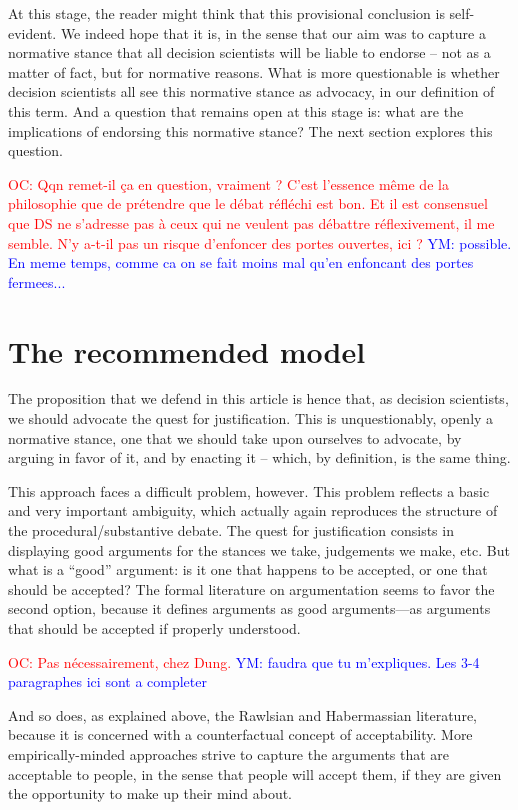 \documentclass[preprint,11pt]{elsarticle}
\newcommand{\commentYM}[1]{\textcolor{blue}{YM: #1}}
\newcommand{\commentOC}[1]{\textcolor{red}{OC: #1}}
\begin{document}
At this stage, the reader might think that this provisional conclusion is self-evident. We indeed hope that it is, in the sense that our aim was to capture a normative stance that all decision scientists will be liable to endorse -- not as a matter of fact, but for normative reasons. What is more questionable is whether decision scientists all see this normative stance as advocacy, in our definition of this term. And a question that remains open at this stage is: what are the implications of endorsing this normative stance? The next section explores this question.

\commentOC{Qqn remet-il ça en question,
vraiment ? C’est l’essence même de la philosophie que de
prétendre que le débat réfléchi est bon. Et il est consensuel
que DS ne s’adresse pas à ceux qui ne veulent pas débattre
réflexivement, il me semble. N’y a-t-il pas un risque
d’enfoncer des portes ouvertes, ici ?}
\commentYM{possible. En meme temps, comme ca on se fait moins mal qu'en enfoncant des portes fermees...}

\section{The recommended model}
\noindent The proposition that we defend in this article is hence that, as decision scientists, we should advocate the quest for justification. This is unquestionably, openly a normative stance, one that we should take upon ourselves to advocate, by arguing in favor of it, and by enacting it -- which, by definition, is the same thing.

This approach faces a difficult problem, however. This problem reflects a basic and very important ambiguity, which actually again reproduces the structure of the procedural/substantive debate. The quest for justification consists in displaying good arguments for the stances we take, judgements we make, etc. But what is a ``good'' argument: is it one that happens to be accepted, or one that should be accepted?
The formal literature on argumentation \cite{dung_acceptability_1995,besnard_elements_2008} seems to favor the second option, because it defines arguments as good arguments—as arguments that should be accepted if properly understood. 

\commentOC{Pas nécessairement, chez Dung.}
\commentYM{faudra que tu m'expliques. Les 3-4 paragraphes ici sont a completer}

And so does, as explained above, the Rawlsian and Habermassian literature, because it is concerned with a counterfactual concept of acceptability. More empirically-minded approaches strive to capture the arguments that are acceptable to people, in the sense that people will accept them, if they are given the opportunity to make up their mind about.
\end{document}
